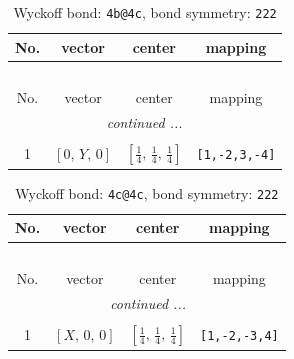 \documentclass[fleqn,8pt]{jsarticle}
\begin{document}
\begin{longtable}{cccc}
\caption{Wyckoff bond: {\tt 4b@4c}, bond symmetry: {\tt 222}}
 \\
 \hline \hline
No. & vector & center & mapping \\ \hline \endfirsthead

\multicolumn{3}{l}{\tablename\ \thetable{}} \\
 \hline \hline
No. & vector & center & mapping \\ \hline \endhead

 \hline \hline
\multicolumn{3}{r}{\footnotesize\it continued ...} \\ \endfoot

 \hline \hline
\multicolumn{3}{r}{} \\ \endlastfoot

1 & $\left[ 0,\, Y,\, 0 \right]$ & $\left[ \frac{1}{4},\, \frac{1}{4},\, \frac{1}{4} \right]$ & {\tt [1,-2,3,-4]} \\
\end{longtable}
\renewcommand{\arraystretch}{1.2}
\begin{longtable}{cccc}
\caption{Wyckoff bond: {\tt 4c@4c}, bond symmetry: {\tt 222}}
 \\
 \hline \hline
No. & vector & center & mapping \\ \hline \endfirsthead

\multicolumn{3}{l}{\tablename\ \thetable{}} \\
 \hline \hline
No. & vector & center & mapping \\ \hline \endhead

 \hline \hline
\multicolumn{3}{r}{\footnotesize\it continued ...} \\ \endfoot

 \hline \hline
\multicolumn{3}{r}{} \\ \endlastfoot

1 & $\left[ X,\, 0,\, 0 \right]$ & $\left[ \frac{1}{4},\, \frac{1}{4},\, \frac{1}{4} \right]$ & {\tt [1,-2,-3,4]} \\
\end{longtable}
\renewcommand{\arraystretch}{1.2}
\end{document}
